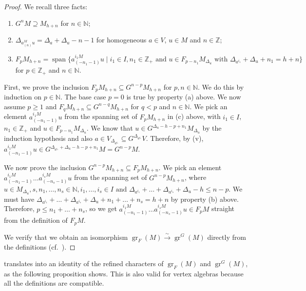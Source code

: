 \documentclass[a4paper, 12pt, reqno]{amsart}
\theoremstyle{remark}
\numberwithin{equation}{subsection}
\DeclareMathOperator{\gr}{gr}
\DeclareMathOperator{\vspan}{span}
\begin{document}
\begin{proof}
  We recall three facts:
  \begin{enumerate}[label = (\alph*)]
  \item $G^nM \supseteq M_{h + n}$ for $n \in \mathbb{N}$;
  \item $\Delta_{a^M_{(n)}u} = \Delta_a + \Delta_u - n - 1$ for homogeneous $a \in V$, $u \in M$ and $n \in \mathbb{Z}$;
  \item $F_pM_{h + n} = \vspan\{a^{i_1M}_{(-n_1 - 1)}u \mid i_1 \in I, n_1 \in \mathbb{Z}_+\text{ and }u \in F_{p - n_1}M_{\Delta_u}\text{ with }\Delta_{a^{i_1}} + \Delta_u + n_1 = h + n\}$ for $p \in \mathbb{Z}_+$ and $n \in \mathbb{N}$.
  \end{enumerate}
  
  First, we prove the inclusion $F_pM_{h + n} \subseteq G^{n - p}M_{h + n}$ for $p, n \in \mathbb{N}$.
  We do this by induction on $p \in \mathbb{N}$.
  The base case $p = 0$ is true by property (a) above.
  We now assume $p \ge 1$ and $F_qM_{h + n} \subseteq G^{n - q}M_{h + n}$ for $q < p$ and $n \in \mathbb{N}$.
  We pick an element $a^{i_1M}_{(-n_1 - 1)}u$ from the spanning set of $F_pM_{h + n}$ in (c) above, with $i_1 \in I$, $n_1 \in \mathbb{Z}_+$ and $u \in F_{p - n_1}M_{\Delta_u}$.
  We know that $u \in G^{\Delta_u - h - p + n_1}M_{\Delta_u}$ by the induction hypothesis and also $a \in V_{\Delta_{a^{i_1}}} \subseteq G^{\Delta_{a^{i_1}}}V$.
  Therefore, by (v), $a^{i_1M}_{(-n_1 - 1)}u \in G^{\Delta_{a^{i_1}} + \Delta_u - h - p + n_1}M = G^{n - p}M$.

  We now prove the inclusion $G^{n - p}M_{h + n} \subseteq F_pM_{h + n}$.
  We pick an element $a^{i_1M}_{(-n_1 - 1)}\dots a^{i_sM}_{(-n_s - 1)}u$ from the spanning set of $G^{n - p}M_{h + n}$, where $u \in M_{\Delta_u}, s, n_1, \dots, n_s \in \mathbb{N}, i_1, \dots, i_s \in I\text{ and }\Delta_{a^{i_1}} + \dots + \Delta_{a^{i_s}} + \Delta_u - h \le n - p$.
  We must have $\Delta_{a^{i_1}} + \dots + \Delta_{a^{i_s}} + \Delta_u + n_1 + \dots + n_s = h + n$ by property (b) above.
  Therefore, $p \le n_1 + \dots + n_s$, so we get $a^{i_1M}_{(-n_1 - 1)}\dots a^{i_sM}_{(-n_s - 1)}u \in F_pM$ straight from the definition of $F_pM$.

  We verify that we obtain an isomorphism $\gr_F(M) \xrightarrow{\sim} \gr^G(M)$ directly from the definitions (cf.\ ).
\end{proof}

 translates into an identity of the refined characters of $\gr_F(M)$ and $\gr^G(M)$, as the following proposition shows.
This is also valid for vertex algebras because all the definitions are compatible.
\end{document}
